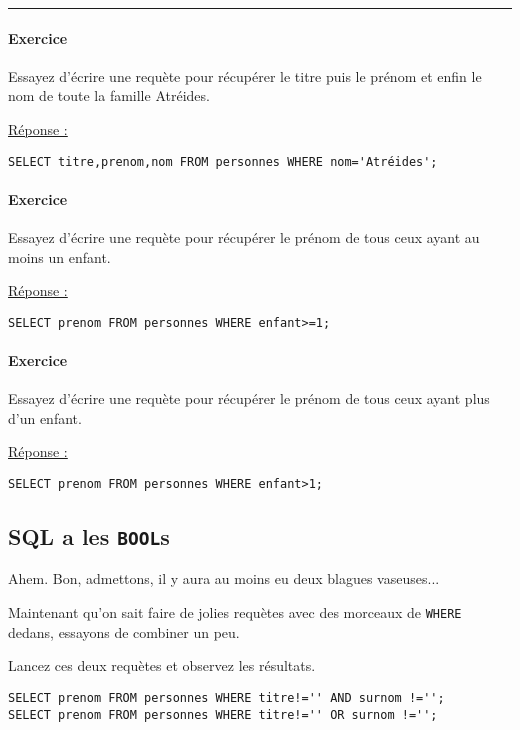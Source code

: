 \documentclass[a4paper, 11pt]{report}
\newcommand\sep{\noindent\rule{\linewidth}{.5pt}}
\begin{document}
\sep
\paragraph{Exercice}
Essayez d'écrire une requète pour récupérer le titre puis le prénom et enfin le nom de toute la famille Atréides.

\underline{Réponse :}

\begin{verbatim}
SELECT titre,prenom,nom FROM personnes WHERE nom='Atréides';
\end{verbatim}

\paragraph{Exercice}
Essayez d'écrire une requète pour récupérer le prénom de tous ceux ayant au moins un enfant.

\underline{Réponse :}

\begin{verbatim}
SELECT prenom FROM personnes WHERE enfant>=1;
\end{verbatim}

\paragraph{Exercice}
Essayez d'écrire une requète pour récupérer le prénom de tous ceux ayant plus d'un enfant.

\underline{Réponse :}

\begin{verbatim}
SELECT prenom FROM personnes WHERE enfant>1;
\end{verbatim}

\subsection{SQL a les \texttt{BOOL}s}

Ahem. Bon, admettons, il y aura au moins eu deux blagues vaseuses...

Maintenant qu'on sait faire de jolies requètes avec des morceaux de \texttt{WHERE} dedans, essayons de combiner un peu.

Lancez ces deux requètes et observez les résultats.

\begin{verbatim}
SELECT prenom FROM personnes WHERE titre!='' AND surnom !='';
SELECT prenom FROM personnes WHERE titre!='' OR surnom !='';
\end{verbatim}
\end{document}

